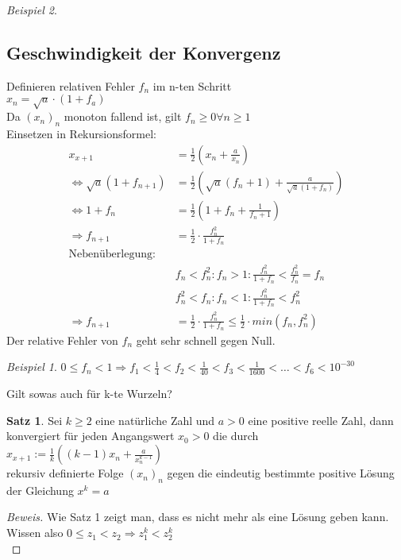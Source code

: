 \documentclass[12pt,a4paper,titlepage]{article} %
\theoremstyle{definition}
\newtheorem{satz}{Satz}[subsection]
\theoremstyle{remark}
\newtheorem*{bsp}{Beispiel}
\newenvironment{bew}{\begin{proof}[Beweis]}{\end{proof}}
\begin{document}
\begin{bsp}
		\subsection{Geschwindigkeit der Konvergenz}
		Definieren relativen Fehler \(f_n\) im n-ten Schritt\\
		\(x_n = \sqrt{a} \cdot (1+f_a)\)\\
		Da \((x_n)_n\) monoton fallend ist, gilt \(f_n \geq 0 \forall n \geq 1\)\\
		Einsetzen in Rekursionsformel:\\
		\begin{align*}
			x_{x+1} &= \frac{1}{2}\left(x_n + \frac{a}{x_n}\right)\\
			\Leftrightarrow \sqrt{a}(1+f_{n+1}) &= \frac{1}{2}\left(\sqrt{a}(f_n+1) + \frac{a}{\sqrt{a}(1+f_n)} \right)\\
			\Leftrightarrow 1 + f_n &= \frac{1}{2}\left(1+f_n+\frac{1}{f_n + 1}\right)\\
			\Rightarrow f_{n+1} &= \frac{1}{2} \cdot \frac{f_n^2}{1 + f_n}\\
			\text{Nebenüberlegung:}\\
			&f_n < f_n^2: f_n > 1: \frac{f_n^2}{1+f_n} < \frac{f_n^2}{f_n} = f_n\\
			&f_n^2 < f_n: f_n < 1: \frac{f_n^2}{1+f_n} < f_n^2 \\
			\Rightarrow f_{n+1} &= \frac{1}{2} \cdot \frac{f_n^2}{1+f_n} \leq \frac{1}{2} \cdot min(f_n, f_n^2)
		\end{align*}
		Der relative Fehler von \(f_n\) geht sehr schnell gegen Null.
		\begin{bsp}
			\(0\leq f_n < 1 \Rightarrow f_1 < \frac{1}{4} < f_2 < \frac{1}{40} < f_3 < \frac{1}{1600} < \ldots < f_6 < 10^{-30}\)
		\end{bsp}
		Gilt sowas auch für k-te Wurzeln?
		\begin{satz}
			Sei \(k \geq 2 \) eine natürliche Zahl und \(a > 0\) eine positive reelle Zahl, dann konvergiert für jeden Angangswert \(x_0 > 0\) die durch\\
			\(x_{x+1} := \frac{1}{k} \left((k-1)x_n + \frac{a}{x_n^{k-1}}\right)\)\\
			rekursiv definierte Folge \((x_n)_n\) gegen die eindeutig bestimmte positive Lösung der Gleichung \(x^k = a\)
		\end{satz}
		\begin{bew}
			Wie Satz 1 zeigt man, dass es nicht mehr als eine Lösung geben kann.\\Wissen also \(0 \leq z_1 < z_2 \Rightarrow z_1^k < z_2^k\)\\

\end{bew}
\end{bsp}
\end{document}
